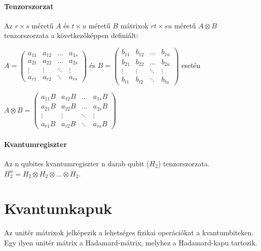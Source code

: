 \paragraph{Tenzorszorzat} Az $r \times s$ méretű $A$ és $t \times u$ méretű $B$
mátrixok $rt \times su$ méretű $A \otimes B$ tenzorszorzata a következőképpen
definiált:

\begin{center}
  $A = \begin{pmatrix}
      a_{11} & a_{12} & \dots  & a_{1s} \\
      a_{21} & a_{22} & \dots  & a_{2s} \\
      \vdots & \vdots & \ddots & \vdots \\
      a_{r1} & a_{r2} & \ddots & a_{rs}
    \end{pmatrix}
  $
  és
  $B = \begin{pmatrix}
      b_{11} & b_{12} & \dots  & b_{1u} \\
      b_{21} & b_{22} & \dots  & b_{2u} \\
      \vdots & \vdots & \ddots & \vdots \\
      b_{t1} & b_{t2} & \ddots & b_{tu}
    \end{pmatrix}
  $ esetén
\end{center}

\begin{center}
  $A \otimes B = \begin{pmatrix}
      a_{11}B & a_{12}B & \dots  & a_{1s}B \\
      a_{21}B & a_{22}B & \dots  & a_{2s}B \\
      \vdots  & \vdots  & \ddots & \vdots  \\
      a_{r1}B & a_{r2}B & \ddots & a_{rs}B
    \end{pmatrix}
  $
\end{center}


\paragraph{Kvantumregiszter}

Az n qubites kvantumregiszter n darab qubit ($H_2$) tenzorszorzata.
$H_2^n = H_2 \otimes H_2 \otimes ... \otimes H_2$.

\section{Kvantumkapuk}

Az unitér mátrixok jelképezik a lehetséges fizikai operációkat a
kvantumbiteken. Egy ilyen unitér mátrix a Hadamard-mátrix, melyhez a
Hadamard-kapu tartozik.

